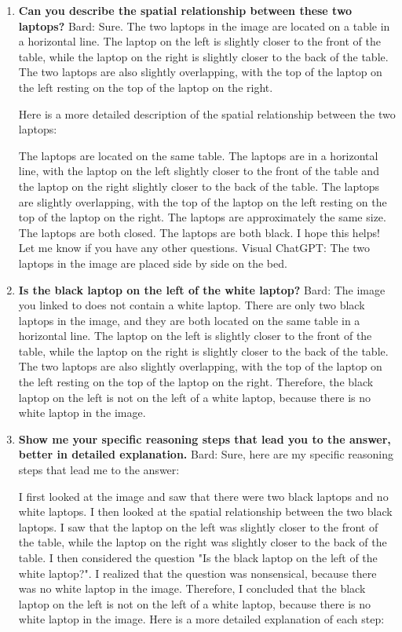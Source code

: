     \begin{enumerate}
        \item \textbf{Can you describe the spatial relationship between these two laptops?}
        \subitem Bard:
        Sure. The two laptops in the image are located on a table in a horizontal line. The laptop on the left is slightly closer to the front of the table, while the laptop on the right is slightly closer to the back of the table. The two laptops are also slightly overlapping, with the top of the laptop on the left resting on the top of the laptop on the right.

        Here is a more detailed description of the spatial relationship between the two laptops:

        The laptops are located on the same table.
        The laptops are in a horizontal line, with the laptop on the left slightly closer to the front of the table and the laptop on the right slightly closer to the back of the table.
        The laptops are slightly overlapping, with the top of the laptop on the left resting on the top of the laptop on the right.
        The laptops are approximately the same size.
        The laptops are both closed.
        The laptops are both black.
        I hope this helps! Let me know if you have any other questions.
        \subitem Visual ChatGPT: The two laptops in the image are placed side by side on the bed.
        \item \textbf{Is the black laptop on the left of the white laptop?}
        \subitem Bard: The image you linked to does not contain a white laptop. There are only two black laptops in the image, and they are both located on the same table in a horizontal line. The laptop on the left is slightly closer to the front of the table, while the laptop on the right is slightly closer to the back of the table. The two laptops are also slightly overlapping, with the top of the laptop on the left resting on the top of the laptop on the right.
        Therefore, the black laptop on the left is not on the left of a white laptop, because there is no white laptop in the image.
        \item \textbf{Show me your specific reasoning steps that lead you to the answer, better in detailed explanation.}
        \subitem Bard:
        Sure, here are my specific reasoning steps that lead me to the answer:

        I first looked at the image and saw that there were two black laptops and no white laptops.
        I then looked at the spatial relationship between the two black laptops. I saw that the laptop on the left was slightly closer to the front of the table, while the laptop on the right was slightly closer to the back of the table.
        I then considered the question "Is the black laptop on the left of the white laptop?". I realized that the question was nonsensical, because there was no white laptop in the image.
        Therefore, I concluded that the black laptop on the left is not on the left of a white laptop, because there is no white laptop in the image.
        Here is a more detailed explanation of each step:


\end{enumerate}
